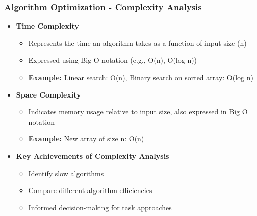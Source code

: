 \documentclass[aspectratio=169]{beamer}
\begin{document}
\begin{frame}[fragile]
    \frametitle{Algorithm Optimization - Complexity Analysis}
    \begin{itemize}
        \item \textbf{Time Complexity} 
        \begin{itemize}
            \item Represents the time an algorithm takes as a function of input size (n)
            \item Expressed using Big O notation (e.g., O(n), O(log n))
            \item \textbf{Example:} Linear search: O(n), Binary search on sorted array: O(log n)
        \end{itemize}
        
        \item \textbf{Space Complexity}
        \begin{itemize}
            \item Indicates memory usage relative to input size, also expressed in Big O notation
            \item \textbf{Example:} New array of size n: O(n)
        \end{itemize}
        
        \item \textbf{Key Achievements of Complexity Analysis}
        \begin{itemize}
            \item Identify slow algorithms
            \item Compare different algorithm efficiencies
            \item Informed decision-making for task approaches
        \end{itemize}
    \end{itemize}
\end{frame}
\end{document}
